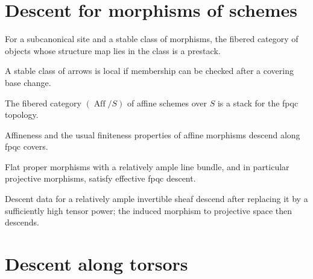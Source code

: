 \section{Descent for morphisms of schemes}

\begin{proposition}\label{fga-prop-4-31}
For a subcanonical site and a stable class of morphisms, the fibered category of
objects whose structure map lies in the class is a prestack.
\end{proposition}
\begin{definition}\label{fga-def-4-32}
A stable class of arrows is local if membership can be checked after a covering
base change.
\end{definition}
\begin{theorem}\label{fga-thm-4-33}
The fibered category $(\operatorname{Aff}/S)$ of affine schemes over $S$ is a
stack for the fpqc topology.
\end{theorem}
\begin{corollary}\label{fga-cor-4-36}
Affineness and the usual finiteness properties of affine morphisms descend
along fpqc covers.
\end{corollary}
\begin{theorem}\label{fga-thm-4-38}
Flat proper morphisms with a relatively ample line bundle, and in particular
projective morphisms, satisfy effective fpqc descent.
\end{theorem}
\begin{proposition}\label{fga-prop-4-40}
Descent data for a relatively ample invertible sheaf descend after replacing it
by a sufficiently high tensor power; the induced morphism to projective space
then descends.
\end{proposition}

\section{Descent along torsors}

